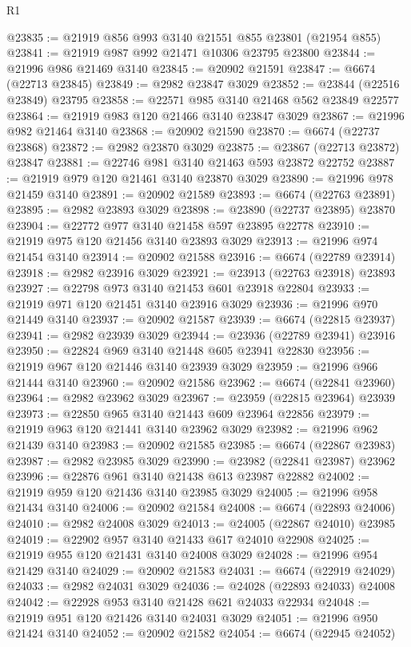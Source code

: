 \begin{lexlean}{R1}
\begin{coremodule}
@23835 := @21919 @856 @993 @3140 @21551 @855 @23801 (@21954 @855)
@23841 := @21919 @987 @992 @21471 @10306 @23795 @23800
@23844 := @21996 @986 @21469 @3140
@23845 := @20902 @21591
@23847 := @6674 (@22713 @23845)
@23849 := @2982 @23847 @3029
@23852 := @23844 (@22516 @23849) @23795
@23858 := @22571 @985 @3140 @21468 @562 @23849 @22577
@23864 := @21919 @983 @120 @21466 @3140 @23847 @3029
@23867 := @21996 @982 @21464 @3140
@23868 := @20902 @21590
@23870 := @6674 (@22737 @23868)
@23872 := @2982 @23870 @3029
@23875 := @23867 (@22713 @23872) @23847
@23881 := @22746 @981 @3140 @21463 @593 @23872 @22752
@23887 := @21919 @979 @120 @21461 @3140 @23870 @3029
@23890 := @21996 @978 @21459 @3140
@23891 := @20902 @21589
@23893 := @6674 (@22763 @23891)
@23895 := @2982 @23893 @3029
@23898 := @23890 (@22737 @23895) @23870
@23904 := @22772 @977 @3140 @21458 @597 @23895 @22778
@23910 := @21919 @975 @120 @21456 @3140 @23893 @3029
@23913 := @21996 @974 @21454 @3140
@23914 := @20902 @21588
@23916 := @6674 (@22789 @23914)
@23918 := @2982 @23916 @3029
@23921 := @23913 (@22763 @23918) @23893
@23927 := @22798 @973 @3140 @21453 @601 @23918 @22804
@23933 := @21919 @971 @120 @21451 @3140 @23916 @3029
@23936 := @21996 @970 @21449 @3140
@23937 := @20902 @21587
@23939 := @6674 (@22815 @23937)
@23941 := @2982 @23939 @3029
@23944 := @23936 (@22789 @23941) @23916
@23950 := @22824 @969 @3140 @21448 @605 @23941 @22830
@23956 := @21919 @967 @120 @21446 @3140 @23939 @3029
@23959 := @21996 @966 @21444 @3140
@23960 := @20902 @21586
@23962 := @6674 (@22841 @23960)
@23964 := @2982 @23962 @3029
@23967 := @23959 (@22815 @23964) @23939
@23973 := @22850 @965 @3140 @21443 @609 @23964 @22856
@23979 := @21919 @963 @120 @21441 @3140 @23962 @3029
@23982 := @21996 @962 @21439 @3140
@23983 := @20902 @21585
@23985 := @6674 (@22867 @23983)
@23987 := @2982 @23985 @3029
@23990 := @23982 (@22841 @23987) @23962
@23996 := @22876 @961 @3140 @21438 @613 @23987 @22882
@24002 := @21919 @959 @120 @21436 @3140 @23985 @3029
@24005 := @21996 @958 @21434 @3140
@24006 := @20902 @21584
@24008 := @6674 (@22893 @24006)
@24010 := @2982 @24008 @3029
@24013 := @24005 (@22867 @24010) @23985
@24019 := @22902 @957 @3140 @21433 @617 @24010 @22908
@24025 := @21919 @955 @120 @21431 @3140 @24008 @3029
@24028 := @21996 @954 @21429 @3140
@24029 := @20902 @21583
@24031 := @6674 (@22919 @24029)
@24033 := @2982 @24031 @3029
@24036 := @24028 (@22893 @24033) @24008
@24042 := @22928 @953 @3140 @21428 @621 @24033 @22934
@24048 := @21919 @951 @120 @21426 @3140 @24031 @3029
@24051 := @21996 @950 @21424 @3140
@24052 := @20902 @21582
@24054 := @6674 (@22945 @24052)

\end{coremodule}
\end{lexlean}
